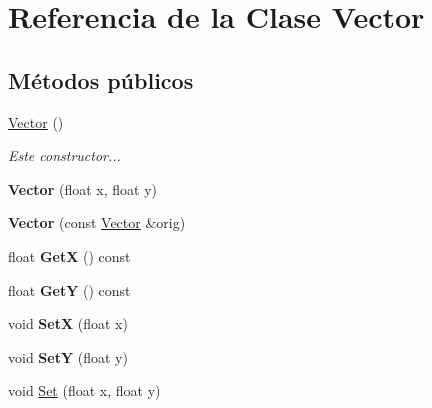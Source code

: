 \hypertarget{classVector}{\section{Referencia de la Clase Vector}
\label{classVector}
}
\subsection*{Métodos públicos}
\begin{DoxyCompactItemize}
\item 
\hypertarget{classVector_a6f80c73b5f18dcf3f8e36065bdc8b9e5}{\hyperlink{classVector_a6f80c73b5f18dcf3f8e36065bdc8b9e5}{Vector} ()}\label{classVector_a6f80c73b5f18dcf3f8e36065bdc8b9e5}

\begin{DoxyCompactList}\small\item\em Este constructor... \end{DoxyCompactList}\item 
\hypertarget{classVector_a7b248851572c39229270f04c3dd192d8}{{\bfseries Vector} (float x, float y)}\label{classVector_a7b248851572c39229270f04c3dd192d8}

\item 
\hypertarget{classVector_a0400ebe778de707c81e56b247d99dcc0}{{\bfseries Vector} (const \hyperlink{classVector}{Vector} \&orig)}\label{classVector_a0400ebe778de707c81e56b247d99dcc0}

\item 
\hypertarget{classVector_a8af2adf29c3264606ae9bde8b30474d3}{float {\bfseries Get\-X} () const }\label{classVector_a8af2adf29c3264606ae9bde8b30474d3}

\item 
\hypertarget{classVector_a1af22bd600a0c05f82492c126ac3c72a}{float {\bfseries Get\-Y} () const }\label{classVector_a1af22bd600a0c05f82492c126ac3c72a}

\item 
\hypertarget{classVector_a54e0ffe36e8115d95738e22eb64b015f}{void {\bfseries Set\-X} (float x)}\label{classVector_a54e0ffe36e8115d95738e22eb64b015f}

\item 
\hypertarget{classVector_a1e1bfb2e0ebcbb70b397fb853093922a}{void {\bfseries Set\-Y} (float y)}\label{classVector_a1e1bfb2e0ebcbb70b397fb853093922a}

\item 
\hypertarget{classVector_ad5d677f0ac46bb6675ab8ee113f4cd1c}{void \hyperlink{classVector_ad5d677f0ac46bb6675ab8ee113f4cd1c}{Set} (float x, float y)}\label{classVector_ad5d677f0ac46bb6675ab8ee113f4cd1c}


\end{DoxyCompactItemize}

